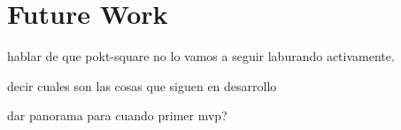 \section{Future Work}\label{sec:z}

hablar de que pokt-square no lo vamos a seguir laburando activamente.

decir cuales son las cosas que siguen en desarrollo

dar panorama para cuando primer mvp?